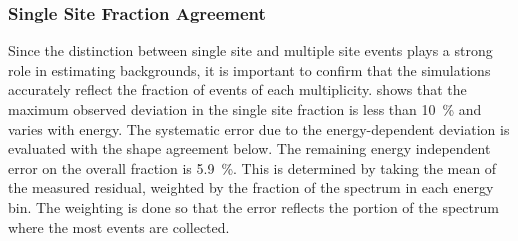 \documentclass[herrin-thesis.tex]{subfiles}
\begin{document}
\subsubsection{Single Site Fraction Agreement}
\label{sec:analysis_ss_frac_agreement}
Since the distinction between single site and multiple site events plays a strong role in estimating backgrounds, it is important to confirm that the simulations accurately reflect the fraction of events of each multiplicity.  shows that the maximum observed deviation in the single site fraction is less than \SI{10}{\percent} and varies with energy. The systematic error due to the energy-dependent deviation is evaluated with the shape agreement below. The remaining energy independent error on the overall fraction is \SI{5.9}{\percent}. This is determined by taking the mean of the measured residual, weighted by the fraction of the \twonu{} spectrum in each energy bin. The weighting is done so that the error reflects the portion of the spectrum where the most events are collected.
\end{document}
